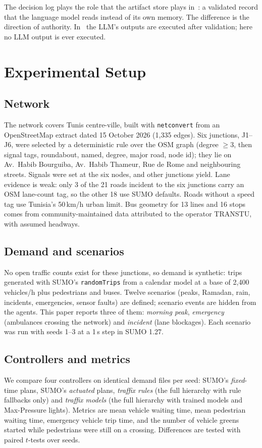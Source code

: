 \documentclass[conference]{IEEEtran}
\begin{document}
The decision log plays the role that the artifact store plays in~\cite{li2026decoupled}: a
validated record that the language model reads instead of its own memory. The difference is
the direction of authority. In~\cite{li2026decoupled} the LLM's outputs are executed after
validation; here no LLM output is ever executed.

\section{Experimental Setup}\label{sec:setup}

\subsection{Network}
The network covers Tunis centre-ville, built with \texttt{netconvert} from an OpenStreetMap
extract dated 15 October 2026 (1{,}335 edges). Six junctions, J1--J6, were selected by a
deterministic rule over the OSM graph (degree $\geq3$, then signal tags, roundabout,
named, degree, major road, node id); they lie on Av.\ Habib Bourguiba, Av.\ Habib
Thameur, Rue de Rome and neighbouring streets. Signals were set at the six nodes, and other
junctions yield. Lane evidence is weak: only 3 of the 21 roads incident to the six
junctions carry an OSM lane-count tag, so the other 18 use SUMO defaults. Roads without a
speed tag use Tunisia's 50\,km/h urban limit. Bus geometry for 13 lines and 16 stops comes
from community-maintained data attributed to the operator TRANSTU, with assumed headways.

\subsection{Demand and scenarios}
No open traffic counts exist for these junctions, so demand is synthetic: trips generated
with SUMO's \texttt{randomTrips} from a calendar model at a base of 2{,}400 vehicles/h plus
pedestrians and buses. Twelve scenarios (peaks, Ramadan, rain, incidents, emergencies,
sensor faults) are defined; scenario events are hidden from the agents. This paper reports
three of them: \emph{morning peak}, \emph{emergency} (ambulances crossing the network) and
\emph{incident} (lane blockages). Each scenario was run with seeds 1--3 at a 1\,s step in
SUMO 1.27.

\subsection{Controllers and metrics}
We compare four controllers on identical demand files per seed: SUMO's \emph{fixed}-time
plans, SUMO's \emph{actuated} plans, \emph{traffix rules} (the full hierarchy with rule
fallbacks only) and \emph{traffix models} (the full hierarchy with trained models and
Max-Pressure lights). Metrics are mean vehicle waiting time, mean pedestrian waiting time,
emergency vehicle trip time, and the number of vehicle greens started while pedestrians
were still on a crossing. Differences are tested with paired $t$-tests over seeds.
\end{document}
